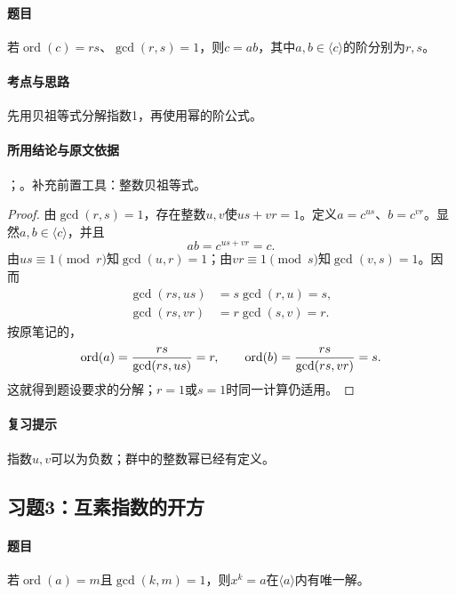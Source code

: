 \paragraph{题目}
若$\operatorname{ord}(c)=rs$、$\gcd(r,s)=1$，则$c=ab$，其中$a,b\in\langle c\rangle$的阶分别为$r,s$。

\paragraph{考点与思路}
先用贝祖等式分解指数1，再使用幂的阶公式。

\paragraph{所用结论与原文依据}
；。补充前置工具：整数贝祖等式。


\begin{proof}
由$\gcd(r,s)=1$，存在整数$u,v$使$us+vr=1$。定义$a=c^{us}$、$b=c^{vr}$。显然$a,b\in\langle c\rangle$，并且
\[
ab=c^{us+vr}=c.
\]
由$us\equiv1\pmod r$知$\gcd(u,r)=1$；由$vr\equiv1\pmod s$知$\gcd(v,s)=1$。因而
\begin{align*}
\gcd(rs,us)&=s\gcd(r,u)=s,\\
\gcd(rs,vr)&=r\gcd(s,v)=r.
\end{align*}
按原笔记的，
\[
\operatorname{ord}(a)=\frac{rs}{\gcd(rs,us)}=r,\qquad
\operatorname{ord}(b)=\frac{rs}{\gcd(rs,vr)}=s.
\]
这就得到题设要求的分解；$r=1$或$s=1$时同一计算仍适用。
\end{proof}

\paragraph{复习提示}
指数$u,v$可以为负数；群中的整数幂已经有定义。


\subsection{习题3：\texorpdfstring{互素指数的开方}{互素指数的开方}}
\label{ex:2:3}

\paragraph{题目}
若$\operatorname{ord}(a)=m$且$\gcd(k,m)=1$，则$x^k=a$在$\langle a\rangle$内有唯一解。

